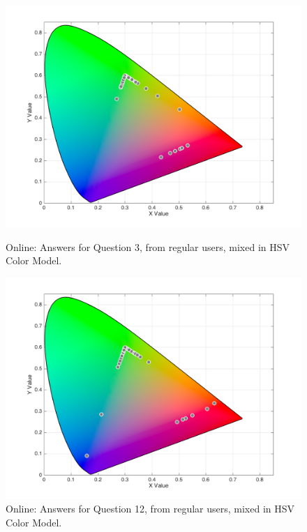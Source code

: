 \begin{figure}[htbp]
  \centering
  \vspace{-15pt}
  \begin{minipage}{0.48\textwidth}
    \centering
    \includegraphics[width=\textwidth]{images/results/3_online_HSVresponses.png}
    \caption[Online: Answers for Question 3, from regular users, mixed in HSV Color Model.]{Online: Answers for Question 3, from regular users, mixed in HSV Color Model.}
    \label{fig:onlinehsvregular_3}
  \end{minipage}\hfill
  \begin{minipage}{0.48\textwidth}
    \centering
    \includegraphics[width=\textwidth]{images/results/12_online_HSVresponses.png}
    \caption[Online: Answers for Question 12, from regular users, mixed in HSV Color Model.]{Online: Answers for Question 12, from regular users, mixed in HSV Color Model.}
    \label{fig:onlinehsvregular_12}
  \end{minipage}
  \vspace{-5pt}
\end{figure}
%
